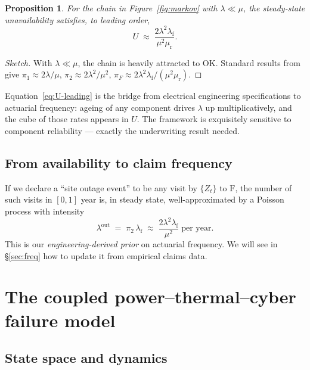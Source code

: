 \documentclass[11pt,a4paper]{article}
\let\origsection\section
\renewcommand{\section}{\clearpage\origsection}
\theoremstyle{ia}
\newtheorem{proposition}[theorem]{Proposition}
\newcommand{\1}{\mathbf{1}}
\begin{document}
\begin{proposition}\label{prop:avail}
For the chain in Figure~\ref{fig:markov} with $\lambda\ll\mu$, the
steady-state unavailability satisfies, to leading order,
\begin{equation}\label{eq:U-leading}
   U \;\approx\; \frac{2\lambda^2 \lambda_{\mathrm f}}{\mu^2 \mu_{\mathrm r}}.
\end{equation}
\end{proposition}

\begin{proof}[Sketch]
With $\lambda\ll\mu$, the chain is heavily attracted to OK. Standard
results from \citet{Trivedi2017} give
$\pi_1\approx 2\lambda/\mu$, $\pi_2\approx 2\lambda^2/\mu^2$,
$\pi_F\approx 2\lambda^2 \lambda_{\mathrm f}/(\mu^2\mu_{\mathrm r})$.
\end{proof}

\noindent Equation~\eqref{eq:U-leading} is the bridge from electrical
engineering specifications to actuarial frequency: ageing of any
component drives $\lambda$ up multiplicatively, and the cube of those
rates appears in $U$. The framework is exquisitely sensitive to
component reliability --- exactly the underwriting result needed.

\subsection{From availability to claim frequency}\label{ss:freq-from-A}

If we declare a ``site outage event'' to be any visit by $\{Z_t\}$ to
$\mathrm{F}$, the number of such visits in $[0,1]$ year is, in steady
state, well-approximated by a Poisson process with intensity
\begin{equation}\label{eq:freq-from-A}
   \lambda^{\mathrm{out}} \;=\; \pi_2 \, \lambda_{\mathrm f}
   \;\approx\; \frac{2\lambda^2 \lambda_{\mathrm f}}{\mu^2}\;
   \text{per year}.
\end{equation}
This is our \emph{engineering-derived prior} on actuarial frequency. We
will see in \S\ref{sec:freq} how to update it from empirical claims
data.


\section{The coupled power--thermal--cyber failure model}\label{sec:coupled}

\subsection{State space and dynamics}
\end{document}

